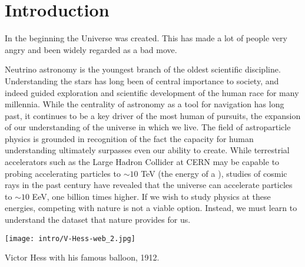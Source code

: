 \setchapterpreamble[u]{\margintoc}
\chapter{Introduction}
\begin{fquote} In the beginning the Universe was created. This has made a lot of people very angry and been widely regarded as a bad move. 
\end{fquote}

Neutrino astronomy is the youngest branch of the oldest scientific discipline. Understanding the stars has long been of central importance to society, and indeed guided exploration and scientific development of the human race for many millennia. While the centrality of astronomy as a tool for navigation has long past, it continues to be a key driver of the most human of pursuits, the expansion of our understanding of the universe in which we live. The field of astroparticle physics is grounded in recognition of the fact the capacity for human understanding ultimately surpasses even our ability to create. While terrestrial accelerators such as the Large Hadron Collider  at CERN may be capable to probing accelerating particles to $\sim 10$  TeV (the energy of a ), studies of cosmic rays in the past century have revealed that the universe  can accelerate particles to $\sim 10$  EeV, one billion times higher. If we wish to study physics at these energies, competing with nature is not a viable option. Instead, we must learn to understand the dataset that nature provides for us.

\begin{marginfigure}
	\centering \texttt{[image: intro/V-Hess-web\_2.jpg]}
	\caption{Victor Hess with his famous balloon, 1912.}
\end{marginfigure}

